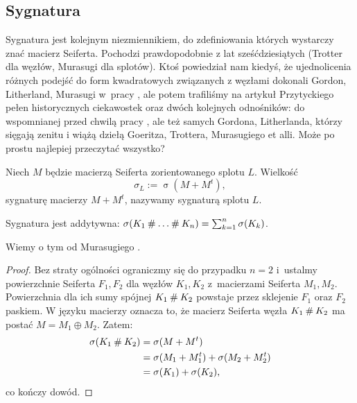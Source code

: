 
\subsection{Sygnatura}
\label{sub:signature}%
%
Sygnatura jest kolejnym niezmiennikiem, do zdefiniowania których wystarczy znać macierz Seiferta.
Pochodzi prawdopodobnie z lat sześćdziesiątych (Trotter \cite{trotter1962} dla węzłów, Murasugi \cite{murasugi1965} dla splotów).
%
%
Ktoś powiedział nam kiedyś, że ujednolicenia różnych podejść do form kwadratowych związanych z węzłami dokonali Gordon, Litherland, Murasugi w~pracy \cite{litherland1981}, ale potem trafiliśmy na artykuł Przytyckiego \cite{przytycki2011} pełen historycznych ciekawostek oraz dwóch kolejnych odnośników: do wspomnianej przed chwilą pracy \cite{murasugi1965}, ale też \cite{gordon1978} samych Gordona, Litherlanda, którzy sięgają zenitu i wiążą dziełą Goeritza, Trottera, Murasugiego et alli.
Może po prostu najlepiej przeczytać wszystko?

\begin{definition}[sygnatura]
\label{def:signature}%
    Niech $M$ będzie macierzą Seiferta zorientowanego splotu $L$.
    Wielkość
    \begin{equation}
        \sigma_L := \operatorname{\sigma} (M + M^t),
    \end{equation}
    sygnaturę macierzy $M + M^t$, nazywamy sygnaturą splotu $L$.
\end{definition}

\begin{proposition}
\label{prp:signature_additive}%
    Sygnatura jest addytywna: $\sigma(K_1 \mathbin{\#} \ldots \mathbin{\#} K_n) = \sum_{k=1}^n \sigma(K_k)$.
\end{proposition}

Wiemy o tym od Murasugiego \cite[s. 127]{murasugi1996}.

\begin{proof}
    Bez straty ogólności ograniczmy się do przypadku $n = 2$ i~ustalmy powierzchnie Seiferta $F_1, F_2$ dla węzłów $K_1, K_2$ z~macierzami Seiferta $M_1, M_2$.
    Powierzchnia dla ich sumy spójnej $K_1 \mathbin{\#} K_2$ powstaje przez sklejenie $F_1$ oraz $F_2$ paskiem.
    W języku macierzy oznacza to, że macierz Seiferta węzła $K_1 \mathbin{\#} K_2$ ma postać $M = M_1 \oplus M_2$.
    Zatem:
    \begin{align}
        \sigma(K_1 \mathbin{\#} K_2) & = \sigma(M + M^t) \\
                               & = \sigma(M_1 + M_1^t) + \sigma(M_2 + M_2^t) \\
                               & = \sigma(K_1) + \sigma(K_2),
    \end{align}
    co kończy dowód.
\end{proof}

